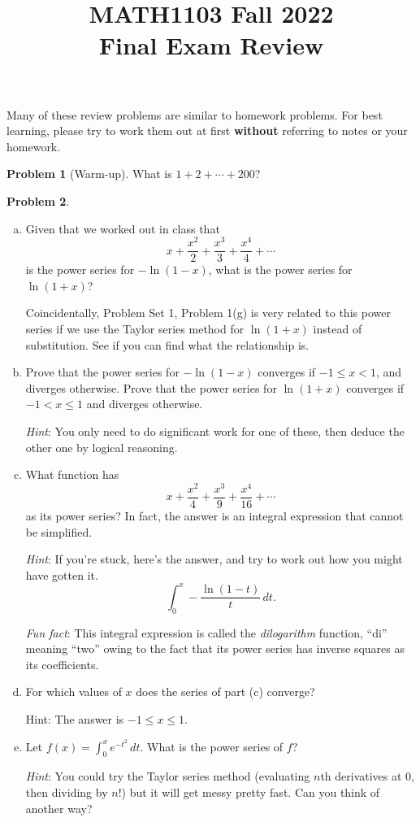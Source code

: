\documentclass[11pt,oneside]{amsart}
\title{MATH1103 Fall 2022\\
Final Exam Review}
\theoremstyle{definition}
\newtheorem{problem}{Problem}
\begin{document}
\maketitle

Many of these review problems are similar to homework problems. For best learning, please try to work them out at first \textbf{without} referring to notes or your homework.

\begin{problem}[Warm-up]
What is $1+2+\cdots+200$?
\end{problem}

\begin{problem}
\leavevmode\begin{enumerate}[(a)]
  \item Given that we worked out in class that
        \[x+\frac {x^2}2+\frac{x^3}3+\frac{x^4}4+\cdots\]
        is the power series for $-\ln(1-x)$, what is the power series for $\ln(1+x)$?

        Coincidentally, Problem Set 1, Problem 1(g) is very related to this power series if we use the Taylor series method for $\ln(1+x)$ instead of substitution. See if you can find what the relationship is.

  \item Prove that the power series for $-\ln(1-x)$ converges if $-1\leq x<1$, and diverges otherwise. Prove that the power series for $\ln(1+x)$ converges if $-1<x\leq1$ and diverges otherwise.

        \emph{Hint}: You only need to do significant work for one of these, then deduce the other one by logical reasoning.

  \item What function has
        \[x+\frac{x^2}4+\frac{x^3}9+\frac{x^4}{16}+\cdots\]
        as its power series? In fact, the answer is an integral expression that cannot be simplified.

        \emph{Hint}: If you're stuck, here's the answer, and try to work out how you might have gotten it.
        \[\int_0^x-\frac{\ln(1-t)}t\,dt.\]

        \emph{Fun fact}: This integral expression is called the \emph{dilogarithm} function, ``di'' meaning ``two'' owing to the fact that its power series has inverse squares as its coefficients.
  \item For which values of $x$ does the series of part (c) converge?

        Hint: The answer is $-1\leq x\leq 1$.

  \item Let $f(x)=\int_0^x e^{-t^2}\,dt$. What is the power series of $f$?

        \emph{Hint}: You could try the Taylor series method (evaluating $n$th derivatives at 0, then dividing by $n!$) but it will get messy pretty fast. Can you think of another way?
\end{enumerate}
\end{problem}
\end{document}
